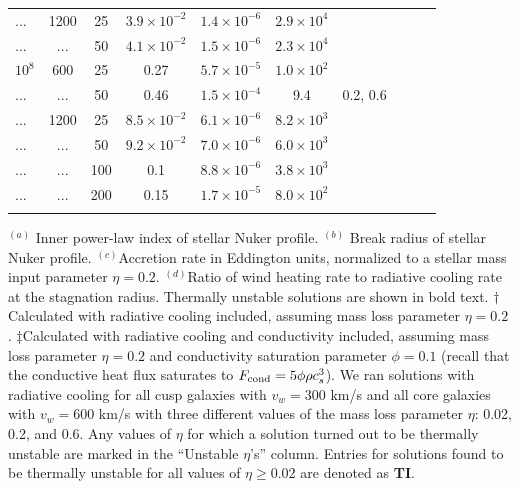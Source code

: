 \documentclass[usenatbib,fleqn]{mn2e}
\begin{document}
\begin{table}
\begin{threeparttable}
\begin{minipage}{18cm}
\begin{tabular}{lccccccccc}
... & 1200 & 25 & $ 3.9 \times 10^{ -2 }$ & $ 1.4 \times 10^{ -6 }$ & $ 2.9 \times 10^{ 4 }$ \\
 ... & ... & 50 & $ 4.1 \times 10^{ -2 }$ & $ 1.5 \times 10^{ -6 }$ & $ 2.3 \times 10^{ 4 }$ \\
$    10^{ 8 }$ & 600 & 25 & 0.27 & $ 5.7 \times 10^{ -5 }$ & $ 1.0 \times 10^{ 2 }$ \\
... & ... & 50 & 0.46 & $ 1.5 \times 10^{ -4 }$ & 9.4 & 0.2, 0.6\\
... & 1200 & 25 & $ 8.5 \times 10^{ -2 }$ & $ 6.1 \times 10^{ -6 }$ & $ 8.2 \times 10^{ 3 }$ \\
... & ... & 50 & $ 9.2 \times 10^{ -2 }$ & $ 7.0 \times 10^{ -6 }$ & $ 6.0 \times 10^{ 3 }$ \\
... & ... & 100 & 0.1 & $ 8.8 \times 10^{ -6 }$ & $ 3.8 \times 10^{ 3 }$ \\
... & ... & 200 & 0.15 & $ 1.7 \times 10^{ -5 }$ & $ 8.0 \times 10^{ 2 }$ \\
\hline
\label{table:models}  
\end{tabular}
\begin{tablenotes}
\item $^{(a)}$ Inner power-law index of stellar Nuker profile.
  $^{(b)}$ Break radius of stellar Nuker profile.  $^{(c)}$Accretion
  rate in Eddington units, normalized to a stellar mass input
  parameter $\eta = 0.2$.  $^{(d)}$Ratio of wind heating rate to
  radiative cooling rate at the stagnation radius.  Thermally unstable
  solutions are shown in bold text.  $\dagger$Calculated with
  radiative cooling included, assuming mass loss parameter $\eta =
  0.2$.  $\ddagger$Calculated with radiative cooling and conductivity
  included, assuming mass loss parameter $\eta = 0.2$ and conductivity
  saturation parameter $\phi = 0.1$ (recall that the conductive heat
  flux saturates to $F_{\rm cond}=5\phi \rho c_s^3$). We ran solutions
  with radiative cooling for all cusp galaxies with $v_w=300 $ km/s
  and all core galaxies with $v_w=600 $ km/s with three different
  values of the mass loss parameter $\eta$: 0.02, 0.2, and 0.6. Any
  values of $\eta$ for which a solution turned out to be thermally
  unstable are marked in the ``Unstable $\eta$'s'' column.  Entries
  for solutions found to be thermally unstable for all values of $\eta
  \geq 0.02$ are denoted as {\bf TI}.
\end{tablenotes}
\end{minipage}
\end{threeparttable}

\end{table}
\end{document}
